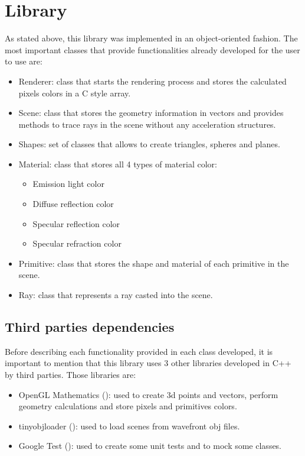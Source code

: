 \fi



\section{Library}

\par
As stated above, this library was implemented in an object-oriented fashion.
The most important classes that provide functionalities already developed for the user to use are:

\begin{itemize}
\item Renderer: class that starts the rendering process and stores the calculated pixels colors in a C style array.
\item Scene: class that stores the geometry information in vectors and provides methods to trace rays in the scene without any acceleration structures.
\item Shapes: set of classes that allows to create triangles, spheres and planes.
\item Material: class that stores all 4 types of material color:
\begin{itemize}
	\item Emission light color
	\item Diffuse reflection color
	\item Specular reflection color
	\item Specular refraction color
\end{itemize}
\item Primitive: class that stores the shape and material of each primitive in the scene.
\item Ray: class that represents a ray casted into the scene.
\end{itemize}

\subsection{Third parties dependencies}

\par
Before describing each functionality provided in each class developed, it is important to mention that this library uses 3 other libraries developed in C++ by third parties.
Those libraries are:

\begin{itemize}
	\item OpenGL Mathematics (\cite{GLM}): used to create 3d points and vectors, perform geometry calculations and store pixels and primitives colors.
	\item tinyobjloader (\cite{tinyobjloader}): used to load scenes from wavefront obj files.
	\item Google Test (\cite{GoogleTest}): used to create some unit tests and to mock some classes.
\end{itemize}

